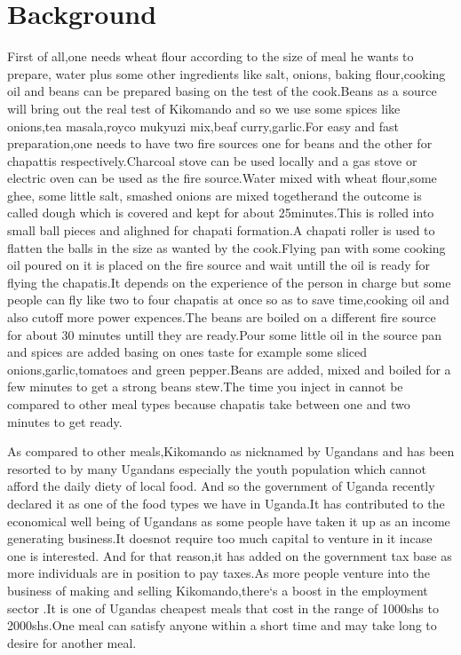 \documentclass{article}
\begin{document}
\section {Background} {First of all,one needs wheat flour according to  the size of meal he wants to prepare, water plus some other ingredients like salt, onions, baking flour,cooking oil and beans can be prepared basing on the test of  the cook.Beans as a source will bring out the real test of Kikomando and so we use some spices like onions,tea masala,royco mukyuzi mix,beaf curry,garlic.For easy and fast preparation,one needs to have two fire sources one  for beans and the other for   chapattis respectively.Charcoal stove can be  used locally and a gas stove or electric oven can be used as the fire source.Water mixed with wheat flour,some ghee, some little salt, smashed onions are mixed togetherand the outcome is called dough which is covered and kept for about 25minutes.This is rolled into small ball pieces and alighned for chapati formation.A chapati roller is used to flatten the balls in the size as wanted by the cook.Flying pan with some cooking oil poured on it is placed on the fire source and wait untill the oil is ready for flying the chapatis.It depends on the experience of the person in charge but some people can fly like two to four chapatis at once so as to save time,cooking oil and also cutoff  more power expences.The beans are boiled on a different fire source for about 30 minutes untill they are ready.Pour some little oil in the source pan and spices are  added basing on ones taste for example some sliced onions,garlic,tomatoes and green pepper.Beans are added, mixed and boiled for a few minutes to get a strong beans stew.The time you inject in cannot be compared to other meal types  because chapatis  take between one and two minutes to get ready.

{
As compared to other meals,Kikomando as nicknamed by Ugandans and has been resorted to by many Ugandans especially the youth population which cannot afford the daily diety of local food. And so the government of Uganda recently declared it as one of the food types we have in Uganda.It has contributed to the economical well being of Ugandans as some people have taken it up as an income generating business.It doesnot require too much capital to venture in it incase one is interested. And for that reason,it has added on the government tax base as more individuals are in position to pay taxes.As more people venture into the business of making and selling Kikomando,there`s a boost in the employment sector .It is one of Ugandas cheapest meals that cost in the range of 1000shs to 2000shs.One meal can satisfy anyone within a short time and may take long to desire for another meal.
}

}
\end{document}
